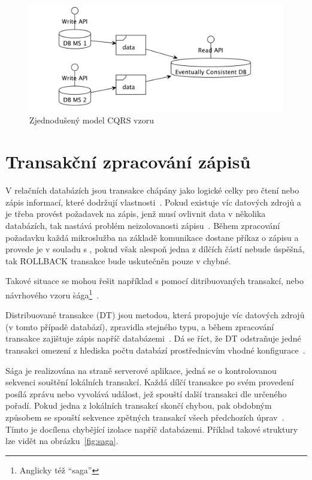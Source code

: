 \begin{figure}[htbp]
   \centering
   \includegraphics[max width=\textwidth]{assets/cqrs}
   \caption{Zjednodušený model CQRS vzoru}\label{fig:cqrs}
\end{figure}



\section{Transakční zpracování zápisů}\label{sec:msa-db-transaction}
V relačních databázích jsou transakce chápány jako logické celky pro čtení nebo zápis informací, které dodržují  vlastnosti~\cite{dbtransactions}.
Pokud existuje víc datových zdrojů a je třeba provést požadavek na zápis, jenž musí ovlivnit data v několika databázích, tak nastává problém neizolovanosti zápisu~\cite{msachris}.
Během zpracování požadavku každá mikroslužba na základě komunikace dostane příkaz o zápisu a provede je v souladu s , pokud však alespoň jedna z dílčích částí nebude úspěšná, tak \h{ROLLBACK} transakce bude uskutečněn pouze v chybné.


Takové situace se mohou řešit například s pomocí ditribuovaných transakcí, nebo návrhového vzoru \h{sága}\footnote{Anglicky též \enquote{saga}}~\cite{msachris}.

Distribuované transakce (DT) jsou metodou, která propojuje víc datových zdrojů (v tomto případě databází), zpravidla stejného typu, a během zpracování transakce zajištuje  zápis napříč databázemi~\cite{distributedtransactions}.
Dá se říct, že DT odstraňuje jedné transakci omezení z hlediska počtu databází prostřednicvím vhodné konfigurace~\cite{distributedtransactionsintegration}.

Sága je realizována na straně serverové aplikace, jedná se o kontrolovanou sekvenci souštění lokálních transakcí.
Každá dílčí transakce po svém provedení posílá zprávu nebo vyvolává událost, jež spouští další transakci dle určeného pořadí.
Pokud jedna z lokálních transakcí skončí chybou, pak obdobným způsobem se spouští sekvence zpětných transakcí všech předchozích úprav~\cite{saga}.
Tímto je docílena chybějící izolace napříč databázemi.
Příklad takové struktury lze vidět na obrázku~\ref{fig:saga}.



